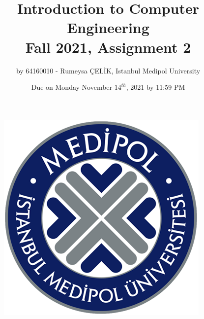 \documentclass[a4paper, 11pt]{report}
\begin{document}
\begin{figure}
\includegraphics[scale=.63]{medipol.png}
\centering
\end{figure}
\begin{titlepage}
\title{Introduction to Computer Engineering \\ Fall 2021, Assignment 2}
\author{by 64160010 - Rumeysa ÇELİK, Istanbul Medipol University}
\date{Due on Monday November $14^{th}$, 2021 by 11:59 PM}
\maketitle
\end{titlepage}
{}
\end{document}
